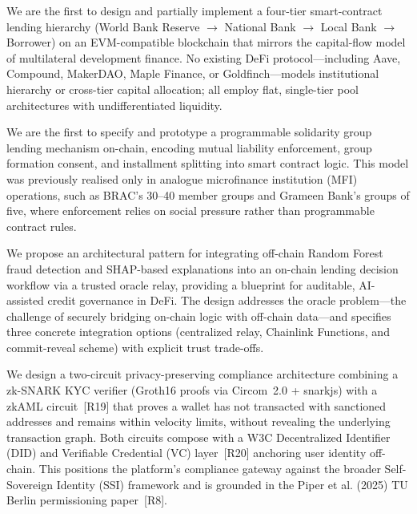 \documentclass[12pt,a4paper]{report}
\begin{document}
\begin{description}[leftmargin=0pt]

\item[\textbf{Contribution 1 --- Four-Tier Hierarchical DeFi Architecture.}]
We are the first to design and partially implement a four-tier smart-contract lending hierarchy (World Bank Reserve $\to$ National Bank $\to$ Local Bank $\to$ Borrower) on an EVM-compatible blockchain that mirrors the capital-flow model of multilateral development finance. No existing DeFi protocol---including Aave, Compound, MakerDAO, Maple Finance, or Goldfinch---models institutional hierarchy or cross-tier capital allocation; all employ flat, single-tier pool architectures with undifferentiated liquidity.

\item[\textbf{Contribution 2 --- On-Chain Solidarity Group Lending.}]
We are the first to specify and prototype a programmable solidarity group lending mechanism on-chain, encoding mutual liability enforcement, group formation consent, and installment splitting into smart contract logic. This model was previously realised only in analogue microfinance institution (MFI) operations, such as BRAC's 30--40 member groups and Grameen Bank's groups of five, where enforcement relies on social pressure rather than programmable contract rules.

\item[\textbf{Contribution 3 --- Oracle-Mediated AI/ML Integration with Explainability.}]
We propose an architectural pattern for integrating off-chain Random Forest fraud detection and SHAP-based explanations into an on-chain lending decision workflow via a trusted oracle relay, providing a blueprint for auditable, AI-assisted credit governance in DeFi. The design addresses the oracle problem---the challenge of securely bridging on-chain logic with off-chain data---and specifies three concrete integration options (centralized relay, Chainlink Functions, and commit-reveal scheme) with explicit trust trade-offs.

\item[\textbf{Contribution 4 --- Compliance-Aware ZKP / zkAML Identity Pathway.}]
We design a two-circuit privacy-preserving compliance architecture combining a zk-SNARK KYC verifier (Groth16 proofs via Circom~2.0 + snarkjs) with a zkAML circuit~[R19] that proves a wallet has not transacted with sanctioned addresses and remains within velocity limits, without revealing the underlying transaction graph. Both circuits compose with a W3C Decentralized Identifier (DID) and Verifiable Credential (VC) layer~[R20] anchoring user identity off-chain. This positions the platform's compliance gateway against the broader Self-Sovereign Identity (SSI) framework and is grounded in the Piper et al. (2025) TU Berlin permissioning paper~[R8].

\end{description}
\end{document}
